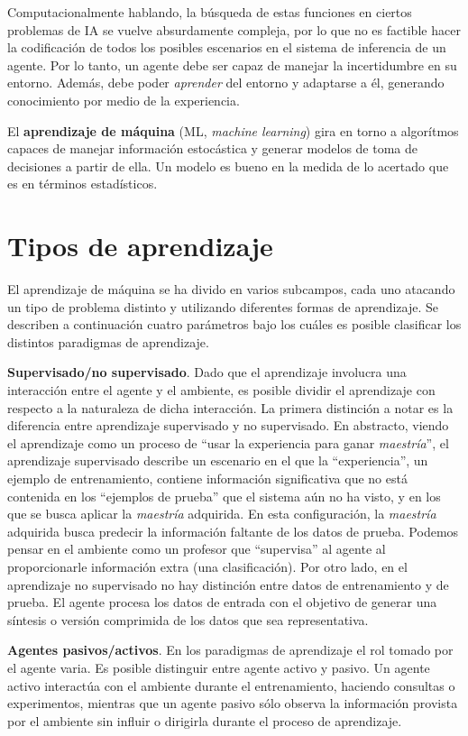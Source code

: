 Computacionalmente hablando, la búsqueda de estas funciones en ciertos
problemas de IA se vuelve absurdamente compleja, por lo que no es
factible hacer la codificación de todos los posibles escenarios en el
sistema de inferencia de un agente. Por lo tanto, un agente debe ser
capaz de manejar la incertidumbre en su entorno. Además, debe
poder \textit{aprender} del entorno y adaptarse a él, generando
conocimiento por medio de la experiencia.

El \textbf{aprendizaje de máquina} (ML, \textit{machine learning})
gira en torno a algorítmos capaces de manejar información estocástica
y generar modelos de toma de decisiones a partir de ella. Un modelo es
bueno en la medida de lo acertado que es en términos estadísticos.

\section{Tipos de aprendizaje}
El aprendizaje de máquina se ha divido en varios subcampos, cada uno
atacando un tipo de problema distinto y utilizando diferentes formas
de aprendizaje. Se describen a continuación cuatro parámetros bajo
los cuáles es posible clasificar los distintos paradigmas de
aprendizaje.

\textbf{Supervisado/no supervisado}. Dado que el aprendizaje involucra
una interacción entre el agente y el ambiente, es posible
dividir el aprendizaje con respecto a la naturaleza de dicha interacción.
La primera distinción a notar es la diferencia entre aprendizaje supervisado
y no supervisado. En abstracto, viendo el aprendizaje como un proceso
de ``usar la experiencia para ganar \textit{maestría}'', el aprendizaje
supervisado describe un escenario en el que la ``experiencia'', un
ejemplo de entrenamiento, contiene información significativa que no
está contenida en los ``ejemplos de prueba'' que el sistema aún no ha
visto, y en los que se busca aplicar la \textit{maestría} adquirida.
En esta configuración, la \textit{maestría} adquirida busca
predecir la información faltante de los datos de prueba. Podemos
pensar en el ambiente como un profesor que ``supervisa'' al agente
al proporcionarle información extra (una clasificación). Por otro lado,
en el aprendizaje no supervisado no hay distinción entre datos de
entrenamiento y de prueba. El agente procesa los datos de entrada
con el objetivo de generar una síntesis o versión comprimida de los
datos que sea representativa.

\textbf{Agentes pasivos/activos}. En los paradigmas de aprendizaje
el rol tomado por el agente varia. Es posible distinguir entre
agente activo y pasivo. Un agente activo interactúa
con el ambiente durante el entrenamiento, haciendo consultas o
experimentos, mientras que un agente pasivo sólo observa la
información provista por el ambiente sin influir
o dirigirla durante el proceso de aprendizaje.

